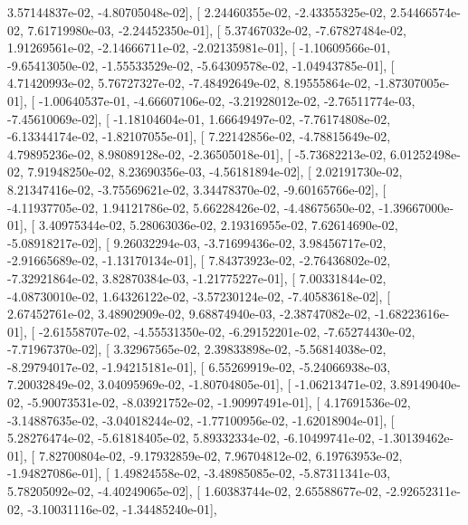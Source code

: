 \documentclass{article}
\begin{document}
          3.57144837e-02,  -4.80705048e-02],
       [  2.24460355e-02,  -2.43355325e-02,   2.54466574e-02,
          7.61719980e-03,  -2.24452350e-01],
       [  5.37467032e-02,  -7.67827484e-02,   1.91269561e-02,
         -2.14666711e-02,  -2.02135981e-01],
       [ -1.10609566e-01,  -9.65413050e-02,  -1.55533529e-02,
         -5.64309578e-02,  -1.04943785e-01],
       [  4.71420993e-02,   5.76727327e-02,  -7.48492649e-02,
          8.19555864e-02,  -1.87307005e-01],
       [ -1.00640537e-01,  -4.66607106e-02,  -3.21928012e-02,
         -2.76511774e-03,  -7.45610069e-02],
       [ -1.18104604e-01,   1.66649497e-02,  -7.76174808e-02,
         -6.13344174e-02,  -1.82107055e-01],
       [  7.22142856e-02,  -4.78815649e-02,   4.79895236e-02,
          8.98089128e-02,  -2.36505018e-01],
       [ -5.73682213e-02,   6.01252498e-02,   7.91948250e-02,
          8.23690356e-03,  -4.56181894e-02],
       [  2.02191730e-02,   8.21347416e-02,  -3.75569621e-02,
          3.34478370e-02,  -9.60165766e-02],
       [ -4.11937705e-02,   1.94121786e-02,   5.66228426e-02,
         -4.48675650e-02,  -1.39667000e-01],
       [  3.40975344e-02,   5.28063036e-02,   2.19316955e-02,
          7.62614690e-02,  -5.08918217e-02],
       [  9.26032294e-03,  -3.71699436e-02,   3.98456717e-02,
         -2.91665689e-02,  -1.13170134e-01],
       [  7.84373923e-02,  -2.76436802e-02,  -7.32921864e-02,
          3.82870384e-03,  -1.21775227e-01],
       [  7.00331844e-02,  -4.08730010e-02,   1.64326122e-02,
         -3.57230124e-02,  -7.40583618e-02],
       [  2.67452761e-02,   3.48902909e-02,   9.68874940e-03,
         -2.38747082e-02,  -1.68223616e-01],
       [ -2.61558707e-02,  -4.55531350e-02,  -6.29152201e-02,
         -7.65274430e-02,  -7.71967370e-02],
       [  3.32967565e-02,   2.39833898e-02,  -5.56814038e-02,
         -8.29794017e-02,  -1.94215181e-01],
       [  6.55269919e-02,  -5.24066938e-03,   7.20032849e-02,
          3.04095969e-02,  -1.80704805e-01],
       [ -1.06213471e-02,   3.89149040e-02,  -5.90073531e-02,
         -8.03921752e-02,  -1.90997491e-01],
       [  4.17691536e-02,  -3.14887635e-02,  -3.04018244e-02,
         -1.77100956e-02,  -1.62018904e-01],
       [  5.28276474e-02,  -5.61818405e-02,   5.89332334e-02,
         -6.10499741e-02,  -1.30139462e-01],
       [  7.82700804e-02,  -9.17932859e-02,   7.96704812e-02,
          6.19763953e-02,  -1.94827086e-01],
       [  1.49824558e-02,  -3.48985085e-02,  -5.87311341e-03,
          5.78205092e-02,  -4.40249065e-02],
       [  1.60383744e-02,   2.65588677e-02,  -2.92652311e-02,
         -3.10031116e-02,  -1.34485240e-01],
\end{document}

